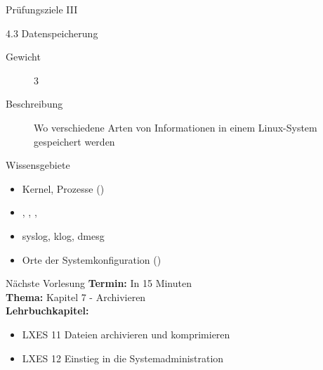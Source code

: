 \documentclass[aspectratio=43]{beamer}
\begin{document}
\begin{frame}{Prüfungsziele III}
  \begin{alertblock}{4.3 Datenspeicherung}
    \begin{description}
      \item[Gewicht]  3
      \item[Beschreibung] Wo verschiedene Arten von Informationen in einem Linux-System gespeichert werden
    \end{description}
       Wissensgebiete\\ 
        \begin{itemize}
          \item Kernel, Prozesse ()
          \item {}, , , 
          \item  syslog, klog, dmesg
          \item Orte der Systemkonfiguration ()
        \end{itemize}
  \end{alertblock}
\end{frame}
\begin{frame}[plain]
  \begin{alertblock}{Nächste Vorlesung}
    \textbf{Termin:} In 15 Minuten\\
    \textbf{Thema:} Kapitel 7 - Archivieren\\
    \textbf{Lehrbuchkapitel:} 
    \begin{itemize}
      \item LXES 11 Dateien archivieren und komprimieren
      \item LXES 12 Einstieg in die Systemadministration
    \end{itemize}
  \end{alertblock}
\end{frame}


\materialframe
\versionframe
\end{document}
